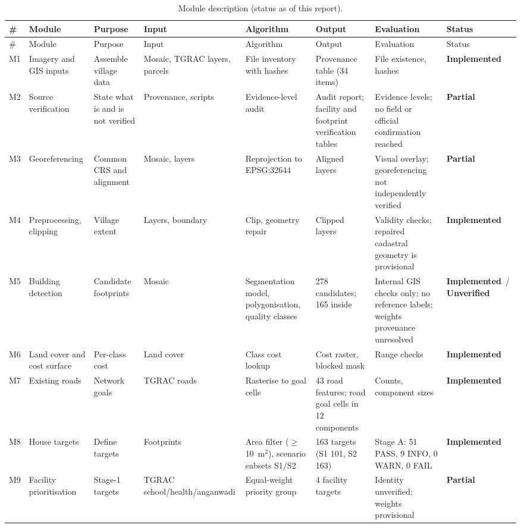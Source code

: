 \documentclass[12pt,a4paper]{report}
\newcommand{\partialS}{\textbf{Partial}}
\newcommand{\impl}{\textbf{Implemented}}
\newcommand{\unver}{\textbf{Unverified}}
\begin{document}
\begin{landscape}\scriptsize
\begin{longtable}{@{}L{0.7cm}L{2.4cm}L{3.3cm}L{3.1cm}L{3.4cm}L{3.5cm}L{3.0cm}L{1.8cm}@{}}
\caption{Module description (status as of this report).}\label{tab:modules}\\
\toprule \# & Module & Purpose & Input & Algorithm & Output & Evaluation & Status\\\midrule\endfirsthead
\toprule \# & Module & Purpose & Input & Algorithm & Output & Evaluation & Status\\\midrule\endhead
\bottomrule\endfoot
M1 & Imagery and GIS inputs & Assemble village data & Mosaic, TGRAC layers, parcels & File inventory with hashes & Provenance table (34 items) & File existence, hashes & \impl\\
M2 & Source verification & State what is and is not verified & Provenance, scripts & Evidence-level audit & Audit report; facility and footprint verification tables & Evidence levels; no field or official confirmation reached & \partialS\\
M3 & Georeferencing & Common CRS and alignment & Mosaic, layers & Reprojection to EPSG:32644 & Aligned layers & Visual overlay; georeferencing not independently verified & \partialS\\
M4 & Preprocessing, clipping & Village extent & Layers, boundary & Clip, geometry repair & Clipped layers & Validity checks; repaired cadastral geometry is provisional & \impl\\
M5 & Building detection & Candidate footprints & Mosaic & Segmentation model, polygonisation, quality classes & 278 candidates; 165 inside & Internal GIS checks only; no reference labels; weights provenance unresolved & \impl\ / \unver\\
M6 & Land cover and cost surface & Per-class cost & Land cover & Class cost lookup & Cost raster, blocked mask & Range checks & \impl\\
M7 & Existing roads & Network goals & TGRAC roads & Rasterise to goal cells & 43 road features; road goal cells in 12 components & Counts, component sizes & \impl\\
M8 & House targets & Define targets & Footprints & Area filter ($\geq$10~m$^2$), scenario subsets S1/S2 & 163 targets (S1 101, S2 163) & Stage A: 51 PASS, 9 INFO, 0 WARN, 0 FAIL & \impl\\
M9 & Facility prioritisation & Stage-1 targets & TGRAC school/health/anganwadi & Equal-weight priority group & 4 facility targets & Identity unverified; weights provisional & \partialS\\

\end{longtable}
\end{landscape}
\end{document}
